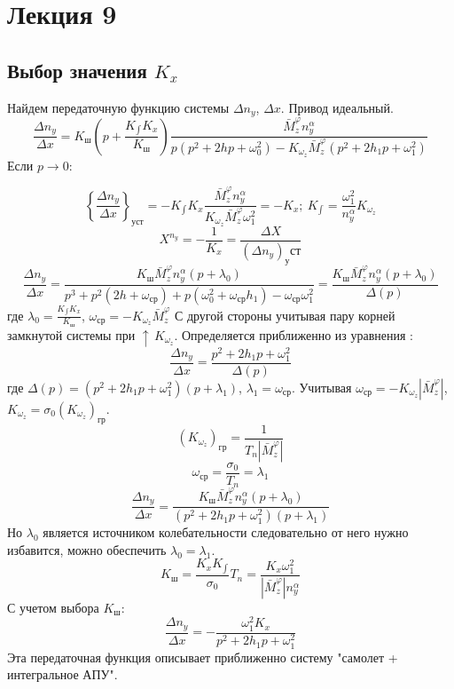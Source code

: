 \documentclass{article}
\begin{document}
\section{Лекция 9}
\subsection{Выбор значения $K_x$}
Найдем передаточную функцию системы $\Delta n_y$, $\Delta x$. Привод идеальный.
\begin{equation}
\frac{\Delta n_y}{\Delta x} = K_ш (p + \frac{K_{\int} K_x}{K_ш}) \frac{\bar{M}_z^{\varphi} n_y^\alpha}{p(p^2 +  2 h p + \omega_0^2) - K_{\omega_z} \bar{M}_z^{\varphi} (p^2 + 2h_{1}p + \omega_1^2)}
\end{equation}
Если $p \rightarrow 0$:

\[
 \left\{ \frac{\Delta n_y}{\Delta x} \right\}_{уст}  = -K_{\int}K_x \frac{\bar{M}_z^{\varphi} n_y^\alpha}{K_{\omega_z} \bar{M}_z^{\varphi} \omega_1^2} = -K_x; \: K_{\int} = \frac{\omega_1^2}{n_y^\alpha} K_{\omega_z}
\]
\[
X^{n_y} = - \frac{1}{K_x} = \frac{\Delta X}{(\Delta n_y)_уст}
\]
\[
\frac{\Delta n_y}{\Delta x} = \frac{K_{ш} \bar{M}_z^\varphi n_y^\alpha(p + \lambda_0)}{p^3 + p^2 (2h+\omega_{ср}) + p (\omega_0^2 + \omega_{ср} h_1) - \omega_{ср} \omega_1^2} = \frac{K_{ш} \bar{M}_z^\varphi n_y^\alpha(p + \lambda_0)}{\Delta(p)}
\]
где $\lambda_0 = \frac{K_{\int} K_x}{K_ш}$, $\omega_{ср} = -K_{\omega_z}\bar{M}_z^\varphi$
С другой стороны учитывая пару корней замкнутой системы при $\uparrow \, K_{\omega_z}$. Определяется приближенно из уравнения :
\[
\frac{\Delta n_y}{\Delta x} = \frac{p^2 + 2 h_1 p + \omega_1^2}{\Delta(p)}
\]
где $\Delta(p) = (p^2 + 2 h_1 p + \omega_1^2)(p + \lambda_1)$, $\lambda_1 = \omega_{ср}$. Учитывая $\omega_{ср} = - K_{\omega_z} |\bar{M}_z^\varphi|$, $K_{\omega_z} = \sigma_0 (K_{\omega_z})_{гр}$.\\
\[
(K_{\omega_z})_{гр} = \frac{1}{T_n |\bar{M}_z^\varphi|}
\]
\[
\omega_{ср} = \frac{\sigma_0}{T_n} = \lambda_1
\]
\[
\frac{\Delta n_y}{\Delta x} = \frac{K_{ш} \bar{M}_z^\varphi n_y^\alpha(p + \lambda_0)}{(p^2 + 2h_{1} p + \omega_1^2)(p+\lambda_1)}
\]
Но $\lambda_0$ является источником колебательности следовательно от него нужно избавится, можно обеспечить $\lambda_0 = \lambda_1$.
\[
K_{ш} = \frac{K_{x} K_{\int}}{\sigma_0} T_n = \frac{K_x \omega_1^2}{|\bar{M}_z^\varphi| n_y^\alpha}
\]
С учетом выбора $K_{ш}$:
\begin{equation}
\frac{\Delta n_y}{\Delta x} = -\frac{\omega_1^2 K_x}{p^2 + 2 h_1 p + \omega_1 ^2}
\end{equation}
Эта передаточная функция описывает приближенно систему "самолет + интегральное АПУ".
\end{document}
